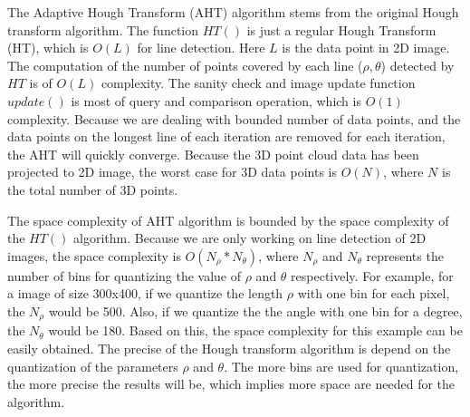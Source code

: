 The Adaptive Hough Transform (AHT) algorithm stems from the original Hough transform algorithm.
The function $HT()$ is just a regular Hough Transform (HT), which is $O(L)$ for line detection. 
Here $L$ is the data point in 2D image.  The computation of the number of points covered by 
each line  ($\rho, \theta$) detected by $HT$ is of $O(L)$ complexity.
The sanity check and image update function $update()$ is most of query and comparison operation, which is
$O(1)$ complexity. Because we are dealing with bounded number of data points, and the data points
on the longest line of each iteration are removed for each iteration, the AHT will quickly converge.
Because the 3D point cloud data has been projected to 2D image, the worst case for 3D data points is
$O(N)$, where $N$ is the total number of 3D points.

The space complexity of AHT algorithm is bounded by the space complexity of the $HT()$ algorithm. 
Because we are only working on line detection of 2D images, the space complexity is $O(N_\rho * N_\theta)$, 
where $N_\rho$ and $N_\theta$ represents the number of bins for quantizing the value of $\rho$
and $\theta$ respectively. For example, for a image of size 300x400, if we quantize the length $\rho$
with one bin for each pixel, the $N_\rho$ would be 500. Also, if we quantize the the angle with one
bin for a degree, the $N_\theta$ would be 180. Based on this, the space complexity for this example 
can be easily obtained. The precise of the Hough transform algorithm is depend on the quantization 
of the parameters $\rho$ and $\theta$. The more bins are used for quantization, the more precise the
results will be, which implies more space are needed for the algorithm.


